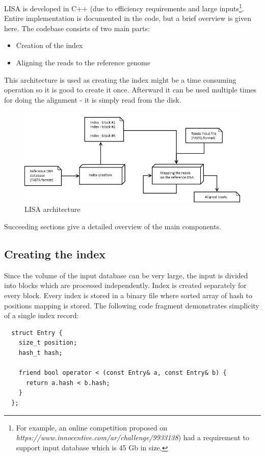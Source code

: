 \documentclass[times, utf8, diplomski]{fer}
\begin{document}
LISA is developed in C++ (due to efficiency requirements and large inputs\footnote{For example, an online competition proposed on \emph{https://www.innocentive.com/ar/challenge/9933138}) had a requirement to support input database which is 45 Gb in size.}. Entire implementation is documented in the code, but a brief overview is given here. The codebase consists of two main parts:
\begin{itemize}
\item Creation of the index
\item Aligning the reads to the reference genome
\end{itemize}
This architecture is used as creating the index might be a time consuming operation so it is good to create it once. Afterward it can be used multiple times for doing the alignment - it is simply read from the disk.\\

\begin{figure}[H]
\centering
\includegraphics[width=1.0\textwidth]{../img/components.png}
\caption{LISA architecture}\label{components}
\end{figure}

Succeeding sections give a detailed overview of the main components.

\subsection{Creating the index}
Since the volume of the input database can be very large, the input is divided into blocks which are processed independently. Index is created separately for every block. Every index is stored in a binary file where sorted array of hash to positions mapping is stored. The following code fragment demonstrates simplicity of a single index record:
\begin{lstlisting}
  struct Entry {
    size_t position;
    hash_t hash;

    friend bool operator < (const Entry& a, const Entry& b) {
      return a.hash < b.hash;
    }
  };
\end{lstlisting}
\end{document}
